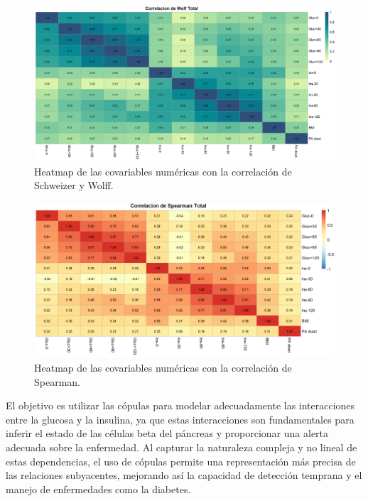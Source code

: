 \begin{figure}[H]
    \centering
    \includegraphics[width = 0.9 \textwidth]{Imagenes/corWolfTotal.png}
    \caption{Heatmap de las covariables numéricas con la correlación de Schweizer y Wolff.}
    \label{fig:corrSWE}
\end{figure}

\begin{figure}[H]
    \centering
    \includegraphics[width = 0.9 \textwidth]{Imagenes/corSperTotal.png}
    \caption{Heatmap de las covariables numéricas con la correlación de Spearman.}
    \label{fig:corSpe}
\end{figure}

El objetivo es utilizar las cópulas para modelar adecuadamente las interacciones entre la glucosa y la insulina, ya que estas interacciones son fundamentales para inferir el estado de las células beta del páncreas y proporcionar una alerta adecuada sobre la enfermedad. Al capturar la naturaleza compleja y no lineal de estas dependencias, el uso de cópulas permite una representación más precisa de las relaciones subyacentes, mejorando así la capacidad de detección temprana y el manejo de enfermedades como la diabetes.


